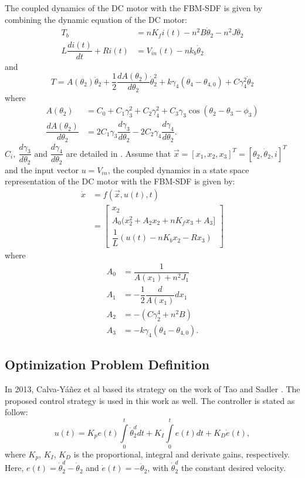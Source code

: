 \documentclass[12pt,letterpape]{article}
\begin{document}
The coupled dynamics of the DC motor with the FBM-SDF is given by combining  the
dynamic equation of the DC motor:
\begin{align}
	T_b &= nK_f i(t) - n^2 B \dot{\theta}_2 - n^2 J \ddot{\theta_2} \\
	L \dfrac{di(t)}{dt} + Ri(t) &= V_{in} (t) - nk_b \dot{\theta}_2
\end{align}
and
$$
	T = A( \theta_2 ) \ddot{\theta}_2 + \frac{1}{2} \dfrac{dA(\theta_2)}{d\theta_2}
	\dot{\theta}_2^2 + k \gamma_4 ( \theta_4 - \theta_{4,0} ) + C \gamma_4^2 \dot{\theta}_2
$$
% 
where
\begin{align}
	A(\theta_2) &=  C_0 + C_1 \gamma_3^2 + C_2 \gamma_4^2 + C_3 \gamma_3 \cos(\theta_2-\theta_3-\phi_3)\\
	\dfrac{dA(\theta_2)}{d\theta_2} &= 2C_1 \gamma_3 \dfrac{d \gamma_3}{d \theta_2} -2C_2 \gamma_4 \dfrac{d \gamma_4}{d \theta_2}.
\end{align}
$C_i,\ \dfrac{d \gamma_3}{d \theta_2}$ and $ \dfrac{d \gamma_4}{d \theta_2 } $ are
detailed in \cite{calva13}.
% 
Assume that $ \vec{x} = [x_1,x_2,x_3]^T = [ \theta_2, \dot{\theta}_2,i ]^T $ and
the input vector $u = V_{in}$, the coupled dynamics in a state space representation
of the DC motor with the FBM-SDF is given by:
\begin{align}
	\dot{x} &= f( \vec{x}, u(t), t ) \\
	&= 
	\begin{bmatrix}
		x_2\\
		A_0( x_2^2 + A_2 x_2 + nK_f x_3 + A_3 ]\\
		\dfrac{1}{L} (u(t) - n K_b x_2 - R x_3)
	\end{bmatrix}
\end{align}
% 
where
\begin{align}
	A_0 &= \dfrac{1}{A(x_1) + n^2 J_1} \\
	A_1 &= -\dfrac{1}{2} \dfrac{d}{A(x_1)}{dx_1} \\
	A_2 &= - (C \gamma_2^4 + n^2 B ) \\
	A_3 &= -k \gamma_4( \theta_4 - \theta_{4,0} ).
\end{align}

\subsection{Optimization Problem Definition} %
\label{sec:optimization_problem_definition}

In 2013, Calva-Y{\'a}{\~n}ez et al \cite{calva13} based its strategy on the work of Tao
and Sadler \cite{tao95}. The proposed control strategy is used in this work as well.
The controller is stated as follow:
%
%
\begin{equation}
	u(t) =  K_{p} e(t) \int\limits_{0}^{t} \dot{\theta}_2^d dt 
	   			+ K_I\int\limits_{0}^{t} e(t) dt + K_D \dot{e}(t),
\end{equation}
%
where $K_p$, $K_I$, $K_D$ is the proportional, integral and derivate gains, 
respectively. Here, $e(t) = \dot{\theta}_2^d - \dot{\theta}_2 $ and
$\dot{e}(t) = - \ddot{\theta}_2 $, with $\dot{\theta}_2^d$ the constant desired velocity. \\
\end{document}
